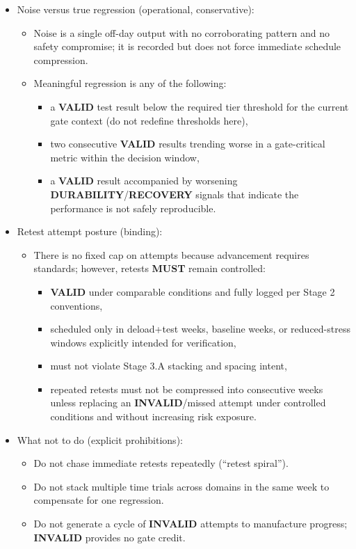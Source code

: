 \documentclass[10pt]{article}
\begin{document}
\begin{itemize}
\item Noise versus true regression (operational, conservative):
\begin{itemize}
\item Noise is a single off-day output with no corroborating pattern and no safety compromise; it is recorded but does not force immediate schedule compression.
\item Meaningful regression is any of the following:
\begin{itemize}
\item a \textbf{VALID} test result below the required tier threshold for the current gate context (do not redefine thresholds here),
\item two consecutive \textbf{VALID} results trending worse in a gate-critical metric within the decision window,
\item a \textbf{VALID} result accompanied by worsening \textbf{DURABILITY}/\textbf{RECOVERY} signals that indicate the performance is not safely reproducible.
\end{itemize}
\end{itemize}

\item Retest attempt posture (binding):
\begin{itemize}
\item There is no fixed cap on attempts because advancement requires standards; however, retests \textbf{MUST} remain controlled:
\begin{itemize}
\item \textbf{VALID} under comparable conditions and fully logged per Stage 2 conventions,
\item scheduled only in deload+test weeks, baseline weeks, or reduced-stress windows explicitly intended for verification,
\item must not violate Stage 3.A stacking and spacing intent,
\item repeated retests must not be compressed into consecutive weeks unless replacing an \textbf{INVALID}/missed attempt under controlled conditions and without increasing risk exposure.
\end{itemize}
\end{itemize}

\item What not to do (explicit prohibitions):
\begin{itemize}
\item Do not chase immediate retests repeatedly (“retest spiral”).
\item Do not stack multiple time trials across domains in the same week to compensate for one regression.
\item Do not generate a cycle of \textbf{INVALID} attempts to manufacture progress; \textbf{INVALID} provides no gate credit.
\end{itemize}


\end{itemize}
\end{document}
